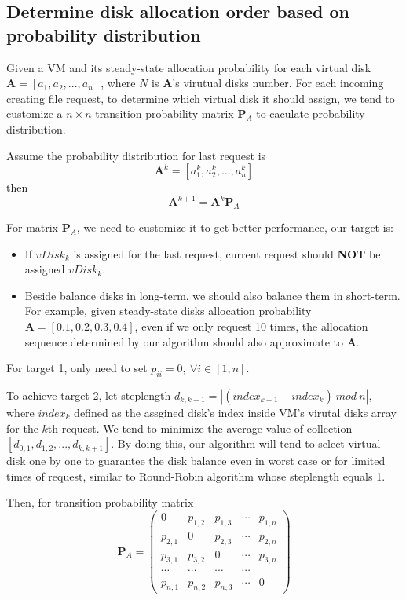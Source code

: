 \documentclass[11pt,a4paper]{article}
\begin{document}
\subsection{\textbf {Determine disk allocation order based on probability distribution}}
\label{sec:problem2}

Given a VM and its steady-state allocation probability for each virtual disk
$\mathbf{A} = [a_1,a_2,...,a_n]$, where $N$ is $\mathbf A$'s virutual disks 
number. For each incoming creating file request, to determine which virtual disk it 
should assign, we tend to customize a $n \times n$ transition probability matrix $\mathbf {P}_A$ to 
caculate probability distribution.

Assume the probability distribution for last request is 
\begin{equation}
\mathbf{A}^{k} = [a_1^k,a_2^k,...,a_n^k]
\end{equation}
then 
\begin{equation}
\mathbf{A}^{k+1} = \mathbf{A}^{k} \mathbf{P}_A
\end{equation}

For matrix $\mathbf{P}_A$, we need to customize it to get better performance, our target is:
\begin{itemize}
  \item If $vDisk_k$ is assigned for the last request, current request should \textbf{NOT} be assigned $vDisk_k$.
  \item Beside balance disks in long-term, we should also balance them in short-term. For example, 
    given steady-state disks allocation probability $\mathbf{A} = [0.1,0.2,0.3,0.4]$, 
    even if we only request 10 times, the allocation sequence 
    determined by our algorithm should also approximate to $\mathbf{A}$.
\end{itemize}

For target 1, only need to set $p_{ii}=0,\ \forall i \in [1,n]$.

To achieve target 2, let steplength $d_{k,k+1} = |(index_{k+1} - index_{k})\ mod \ n|$, 
where $index_{k}$ defined as the assgined disk's index inside VM's virutal disks array for 
the $k$th request. We tend to minimize the average value of collection $[d_{0,1},d_{1,2},...,d_{k,k+1}]$.
By doing this, our algorithm will tend to select virtual disk one by one to guarantee 
the disk balance even in worst case or for limited times of request, similar to Round-Robin 
algorithm whose steplength equals 1.

Then, for transition probability matrix
\begin{equation}
  \mathbf{P}_A = 
  \begin{pmatrix}
    0 & p_{1,2} & p_{1,3} & \cdots & p_{1,n} \\
    p_{2,1} & 0 & p_{2,3} & \cdots & p_{2,n} \\
    p_{3,1} & p_{3,2} & 0 & \cdots & p_{3,n} \\
     \cdots & \cdots & \cdots & \cdots \\
    p_{n,1} & p_{n,2} & p_{n,3} & \cdots & 0
  \end{pmatrix}
\end{equation}
\end{document}
